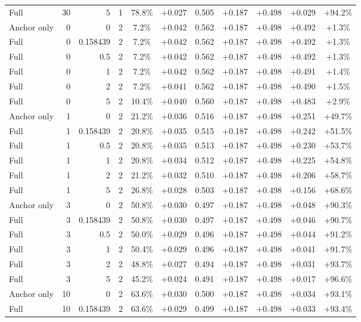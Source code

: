 \begin{table}[htbp]
\begin{tabular}{lrrrccccccc}
Full & 30 & 5 & 1 & 78.8\% & +0.027 & 0.505 & +0.187 & +0.498 & +0.029 & +94.2\% \\
Anchor only & 0 & 0 & 2 & 7.2\% & +0.042 & 0.562 & +0.187 & +0.498 & +0.492 & +1.3\% \\
Full & 0 & 0.158439 & 2 & 7.2\% & +0.042 & 0.562 & +0.187 & +0.498 & +0.492 & +1.3\% \\
Full & 0 & 0.5 & 2 & 7.2\% & +0.042 & 0.562 & +0.187 & +0.498 & +0.492 & +1.3\% \\
Full & 0 & 1 & 2 & 7.2\% & +0.042 & 0.562 & +0.187 & +0.498 & +0.491 & +1.4\% \\
Full & 0 & 2 & 2 & 7.2\% & +0.041 & 0.562 & +0.187 & +0.498 & +0.490 & +1.5\% \\
Full & 0 & 5 & 2 & 10.4\% & +0.040 & 0.560 & +0.187 & +0.498 & +0.483 & +2.9\% \\
Anchor only & 1 & 0 & 2 & 21.2\% & +0.036 & 0.516 & +0.187 & +0.498 & +0.251 & +49.7\% \\
Full & 1 & 0.158439 & 2 & 20.8\% & +0.035 & 0.515 & +0.187 & +0.498 & +0.242 & +51.5\% \\
Full & 1 & 0.5 & 2 & 20.8\% & +0.035 & 0.513 & +0.187 & +0.498 & +0.230 & +53.7\% \\
Full & 1 & 1 & 2 & 20.8\% & +0.034 & 0.512 & +0.187 & +0.498 & +0.225 & +54.8\% \\
Full & 1 & 2 & 2 & 21.2\% & +0.032 & 0.510 & +0.187 & +0.498 & +0.206 & +58.7\% \\
Full & 1 & 5 & 2 & 26.8\% & +0.028 & 0.503 & +0.187 & +0.498 & +0.156 & +68.6\% \\
Anchor only & 3 & 0 & 2 & 50.8\% & +0.030 & 0.497 & +0.187 & +0.498 & +0.048 & +90.3\% \\
Full & 3 & 0.158439 & 2 & 50.8\% & +0.030 & 0.497 & +0.187 & +0.498 & +0.046 & +90.7\% \\
Full & 3 & 0.5 & 2 & 50.0\% & +0.029 & 0.496 & +0.187 & +0.498 & +0.044 & +91.2\% \\
Full & 3 & 1 & 2 & 50.4\% & +0.029 & 0.496 & +0.187 & +0.498 & +0.041 & +91.7\% \\
Full & 3 & 2 & 2 & 48.8\% & +0.027 & 0.494 & +0.187 & +0.498 & +0.031 & +93.7\% \\
Full & 3 & 5 & 2 & 45.2\% & +0.024 & 0.491 & +0.187 & +0.498 & +0.017 & +96.6\% \\
Anchor only & 10 & 0 & 2 & 63.6\% & +0.030 & 0.500 & +0.187 & +0.498 & +0.034 & +93.1\% \\
Full & 10 & 0.158439 & 2 & 63.6\% & +0.029 & 0.499 & +0.187 & +0.498 & +0.033 & +93.4\% \\

\end{tabular}
\end{table}
